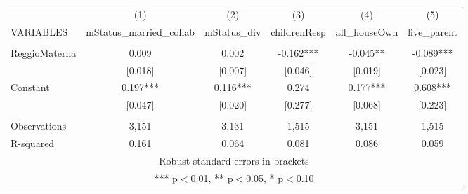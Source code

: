 \begin{tabular}{lccccc} \hline
 & (1) & (2) & (3) & (4) & (5) \\
VARIABLES & mStatus\_married\_cohab & mStatus\_div & childrenResp & all\_houseOwn & live\_parent \\ \hline
 &  &  &  &  &  \\
ReggioMaterna & 0.009 & 0.002 & -0.162*** & -0.045** & -0.089*** \\
 & [0.018] & [0.007] & [0.046] & [0.019] & [0.023] \\
Constant & 0.197*** & 0.116*** & 0.274 & 0.177*** & 0.608*** \\
 & [0.047] & [0.020] & [0.277] & [0.068] & [0.223] \\
 &  &  &  &  &  \\
Observations & 3,151 & 3,131 & 1,515 & 3,151 & 1,515 \\
 R-squared & 0.161 & 0.064 & 0.081 & 0.086 & 0.059 \\ \hline
\multicolumn{6}{c}{ Robust standard errors in brackets} \\
\multicolumn{6}{c}{ *** p$<$0.01, ** p$<$0.05, * p$<$0.10} \\
\end{tabular}
